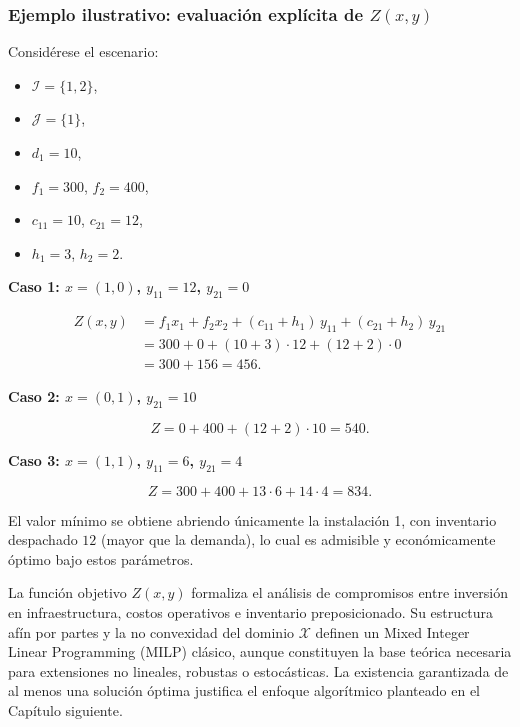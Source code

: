\documentclass[
  spanish,
  us-letterpaper,
  DIV=11,
  numbers=noendperiod]{scrreprt}
\providecommand{\tightlist}{%
  \setlength{\itemsep}{0pt}\setlength{\parskip}{0pt}}
\numberwithin{equation}{section}
\begin{document}
\subsubsection{\texorpdfstring{\textbf{Ejemplo ilustrativo: evaluación
explícita de
\(Z(x, y)\)}}{Ejemplo ilustrativo: evaluación explícita de Z(x, y)}}\label{ejemplo-ilustrativo-evaluaciuxf3n-expluxedcita-de-zx-y}

Considérese el escenario:

\begin{itemize}
\tightlist
\item
  \(\mathcal{I} = \{1,2\}\),\\
\item
  \(\mathcal{J} = \{1\}\),\\
\item
  \(d_1 = 10\),\\
\item
  \(f_1 = 300\), \(f_2 = 400\),\\
\item
  \(c_{11} = 10\), \(c_{21} = 12\),\\
\item
  \(h_1 = 3\), \(h_2 = 2\).
\end{itemize}

\textbf{Caso 1: \(x = (1, 0)\), \(y_{11} = 12\), \(y_{21} = 0\)}

\[
\begin{aligned}
Z(x,y)
&= f_1 x_1 + f_2 x_2 + (c_{11}+h_1)\,y_{11} + (c_{21}+h_2)\,y_{21} \\
&= 300 + 0 + (10+3)\cdot 12 + (12+2)\cdot 0 \\
&= 300 + 156 = 456.
\end{aligned}
\]

\textbf{Caso 2: \(x = (0,1)\), \(y_{21} = 10\)}

\[
Z = 0 + 400 + (12+2)\cdot 10 = 540.
\]

\textbf{Caso 3: \(x = (1,1)\), \(y_{11} = 6\), \(y_{21} = 4\)}

\[
Z = 300 + 400 + 13\cdot 6 + 14\cdot 4 = 834.
\]

El valor mínimo se obtiene abriendo únicamente la instalación 1, con
inventario despachado \(12\) (mayor que la demanda), lo cual es
admisible y económicamente óptimo bajo estos parámetros.

La función objetivo \(Z(x, y)\) formaliza el análisis de compromisos
entre inversión en infraestructura, costos operativos e inventario
preposicionado. Su estructura afín por partes y la no convexidad del
dominio \(\mathcal{X}\) definen un Mixed Integer Linear Programming
(MILP) clásico, aunque constituyen la base teórica necesaria para
extensiones no lineales, robustas o estocásticas. La existencia
garantizada de al menos una solución óptima justifica el enfoque
algorítmico planteado en el Capítulo siguiente.
\end{document}
